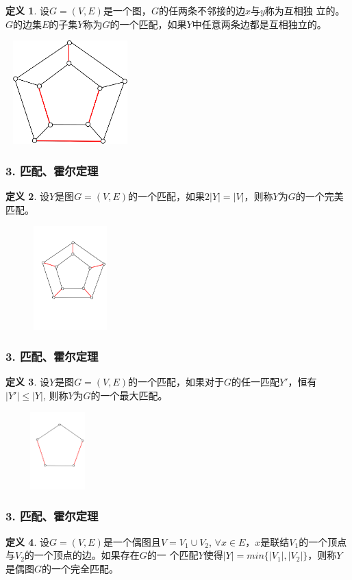 \documentclass{beamer}
\theoremstyle{definition}
\newtheorem{Def}{定义}[section]
\theoremstyle{example}
\begin{document}
\begin{CJK}{UTF8}{gbsn}
\begin{frame}
  \begin{Def}
    设$G=(V,E)$是一个图，$G$的任两条不邻接的边$x$与$y$称为互相\alert{独
      立}的。$G$的边集$E$的子集$Y$称为$G$的一个\alert{匹配}，如果$Y$中任意两条边都是互相独立的。
  \end{Def}
\pause
\centering
\includegraphics[width=5cm,height=4cm]{matching}
\end{frame}
\begin{frame}
  \frametitle{3. 匹配、霍尔定理}
  \begin{Def}
    设$Y$是图$G=(V,E)$的一个匹配，如果$2|Y|=|V|$，则称$Y$为$G$的一个\alert{完美匹配}。
  \end{Def}
\pause
\centering
\includegraphics[width=5cm,height=4cm]{perfect}
\end{frame}

\begin{frame}
  \frametitle{3. 匹配、霍尔定理}

    \begin{Def}
   设$Y$是图$G=(V,E)$的一个匹配，如果对于$G$的任一匹配$Y'$，恒有$|Y'|\leq |Y|$, 则称$Y$为$G$的一个\alert{最大匹配}。
  \end{Def}
\pause
\centering
\includegraphics[width=4cm,height=3cm]{maximum}

\end{frame}
\begin{frame}
  \frametitle{3. 匹配、霍尔定理}

  \begin{Def}
    设$G=(V,E)$是一个偶图且$V=V_1\cup V_2$,
    $\forall x \in
    E$，$x$是联结$V_1$的一个顶点与$V_2$的一个顶点的边。如果存在$G$的一
    个匹配$Y$使得$|Y|=min\{|V_1|,|V_2|\}$，则称$Y$是偶图$G$的一个\alert{完全匹配}。
  \end{Def}

\end{frame}
\end{CJK}
\end{document}
